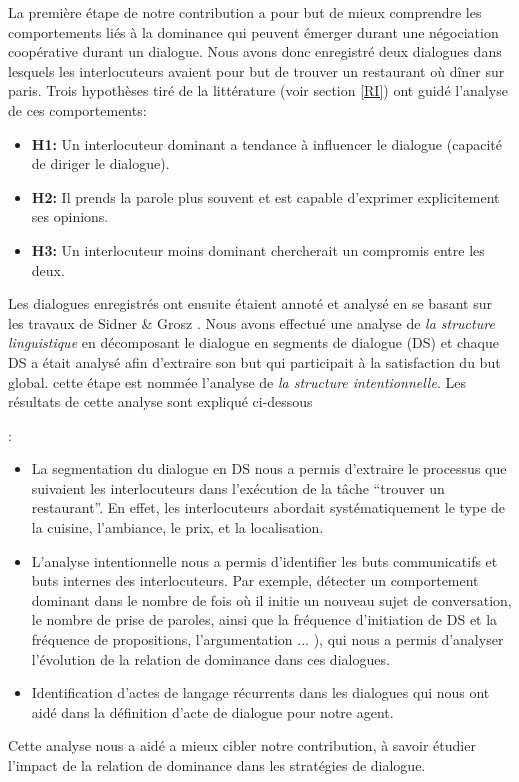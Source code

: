 \documentclass [french]{sig-alternate-05-2015}
\begin{document}
{ \color{red}La première étape de notre contribution a pour but de mieux comprendre les comportements liés à la dominance qui peuvent émerger durant une négociation coopérative durant un dialogue. Nous avons donc enregistré deux dialogues dans lesquels les interlocuteurs avaient pour but de trouver un restaurant où dîner sur paris. Trois hypothèses tiré de la littérature (voir section \ref{RI}) ont guidé l'analyse de ces comportements: 
\begin{itemize}
\item \textbf{H1:} Un interlocuteur dominant a tendance à influencer le dialogue (capacité de diriger le dialogue).
\item \textbf{H2:} Il prends la parole plus souvent et est capable d'exprimer explicitement ses opinions.
\item \textbf{H3:} Un interlocuteur moins dominant chercherait un compromis entre les deux. 
\end{itemize}
 Les dialogues enregistrés ont ensuite étaient annoté et analysé en se basant sur les travaux de Sidner \& Grosz \cite{grosz1986attention}. Nous avons effectué une analyse de \textit{la structure linguistique}  en décomposant le dialogue en segments de dialogue (DS)  et chaque DS a était analysé afin d'extraire son but qui participait à la satisfaction du but global. cette étape est nommée l'analyse de \textit{la structure intentionnelle}. Les résultats de cette analyse sont expliqué ci-dessous}: 

\begin{itemize}

		\item  La segmentation du dialogue en DS nous a permis d'extraire le processus que suivaient les interlocuteurs dans l'exécution de la tâche  ``trouver un restaurant''. En effet, les interlocuteurs abordait systématiquement le type de la cuisine, l'ambiance, le prix, et la localisation. 
		\item L'analyse intentionnelle nous a permis d'identifier les buts communicatifs et buts internes des interlocuteurs. Par exemple, détecter un comportement dominant dans le nombre de fois où il initie un nouveau sujet de conversation, le nombre de prise de paroles, ainsi que la fréquence d'initiation de DS et la fréquence de propositions, l'argumentation ... ), qui nous a permis d'analyser l'évolution de la relation de dominance dans ces dialogues. 
		\item Identification d'actes de langage récurrents dans les dialogues qui nous ont aidé dans la définition d'acte de dialogue pour notre agent.	
	
\end{itemize}
\par Cette analyse nous a aidé a mieux cibler notre contribution, à savoir étudier l'impact de la relation de dominance dans les stratégies de dialogue.
\end{document}
